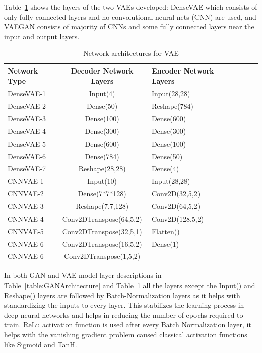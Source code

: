 \documentclass{article}
\begin{document}
	Table~\ref{table:VAEArchitecture} shows the layers of the two VAEs developed: DenseVAE which consists of only fully connected layers and no convolutional neural nets (CNN) are used, and VAEGAN consists of majority of CNNs and some fully connected layers near the input and output layers. 

	\begin{table}[t]
		\caption{Network architectures for VAE}
		\label{table:VAEArchitecture}
		\centering
		\begin{tabular}{lclclcl}
			
			\toprule
			
			Network Type & Decoder Network Layers & Encoder Network Layers \\
			
			\midrule
			
			DenseVAE-1   & Input(4)     	        & Input(28,28)  \\
			DenseVAE-2   & Dense(50)    	        & Reshape(784)  \\
			DenseVAE-3   & Dense(100)     	        & Dense(600)  \\
			DenseVAE-4   & Dense(300)     	        & Dense(300)  \\
			DenseVAE-5   & Dense(600)     	        & Dense(100)  \\
			DenseVAE-6   & Dense(784)     	        & Dense(50)  \\
			DenseVAE-7   & Reshape(28,28)     	    & Dense(4)  \\
			
			\midrule
			
			CNNVAE-1   & Input(10)     	        		& Input(28,28)  \\
			CNNVAE-2   & Dense(7*7*128)     	        & Conv2D(32,5,2)  \\
			CNNVAE-3   & Reshape(7,7,128)     	        & Conv2D(64,5,2)  \\		
			CNNVAE-4   & Conv2DTranspose(64,5,2)     	& Conv2D(128,5,2)  \\		
			CNNVAE-5   & Conv2DTranspose(32,5,1)     	& Flatten()  \\
			CNNVAE-6   & Conv2DTranspose(16,5,2)     	& Dense(1)  \\
			CNNVAE-6   & Conv2DTranspose(1,5,2)     	&   \\		
			
			\bottomrule
		\end{tabular}
	\end{table}	

	In both GAN and VAE model layer descriptions in Table~\ref{table:GANArchitecture} and Table~\ref{table:VAEArchitecture} all the layers except the Input() and Reshape() layers are followed by Batch-Normalization layers as it helps with standardizing the inputs to every layer. This stabilizes the learning process in deep neural networks and helps in reducing the number of epochs required to train. ReLu activation function is used after every Batch Normalization layer, it helps with the vanishing gradient problem caused classical activation functions like Sigmoid and TanH.
	
\end{document}
